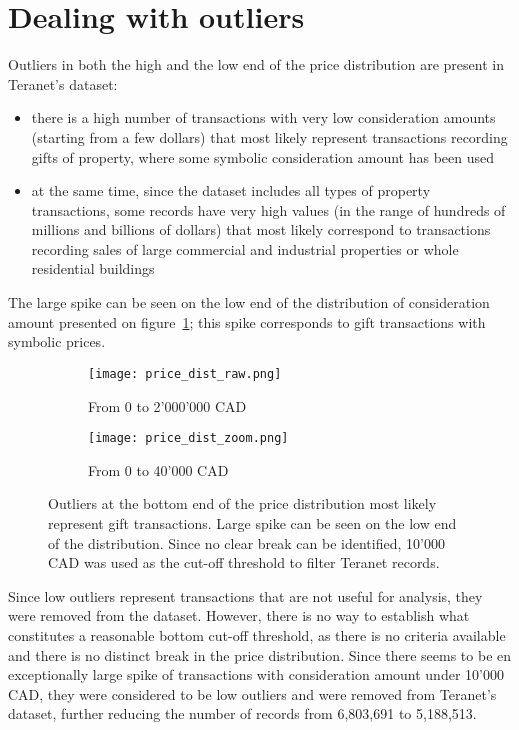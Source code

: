 \section{Dealing with outliers} \label{sec:outliers}

Outliers in both the high and the low end of the price distribution are present in Teranet's dataset:
\begin{itemize}
    \item there is a high number of transactions with very low consideration amounts (starting from a few dollars) that most likely represent transactions recording gifts of property, where some symbolic consideration amount has been used
    \item at the same time, since the dataset includes all types of property transactions, some records have very high values (in the range of hundreds of millions and billions of dollars) that most likely correspond to transactions recording sales of large commercial and industrial properties or whole residential buildings
\end{itemize}

The large spike can be seen on the low end of the distribution of consideration amount presented on figure~\ref{fig:bottom_outliers}; this spike corresponds to gift transactions with symbolic prices.
\begin{figure}[ht]
    \centering
    \begin{subfigure}{\linewidth}
        \centering
        \texttt{[image: price\_dist\_raw.png]}
        \caption{From 0 to 2'000'000 CAD}
    \end{subfigure}

    \begin{subfigure}{\linewidth}
        \centering
        \texttt{[image: price\_dist\_zoom.png]}
        \caption{From 0 to 40'000 CAD}
    \end{subfigure}
    \caption{Outliers at the bottom end of the price distribution most likely represent gift transactions.
    Large spike can be seen on the low end of the distribution.
    Since no clear break can be identified, 10'000 CAD was used as the cut-off threshold to filter Teranet records.}
    \label{fig:bottom_outliers}
\end{figure}

Since low outliers represent transactions that are not useful for analysis, they were removed from the dataset.
However, there is no way to establish what constitutes a reasonable bottom cut-off threshold, as there is no criteria available and there is no distinct break in the price distribution.
Since there seems to be en exceptionally large spike of transactions with consideration amount under 10'000 CAD, they were considered to be low outliers and were removed from Teranet's dataset, further reducing the number of records from 6,803,691 to 5,188,513.

